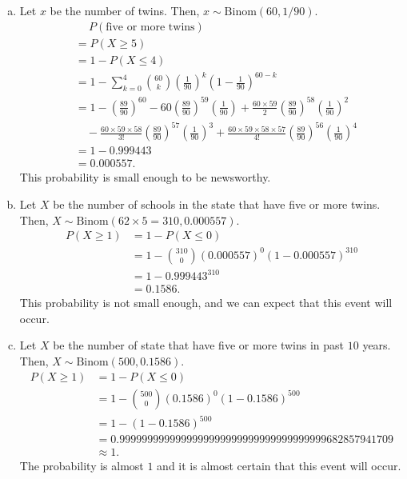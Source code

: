 \documentclass[14pt]{elegantbook}
\begin{document}
    \begin{solution}
        \begin{enumerate}[(a)]
            \item Let $x$ be the number of twins. Then, $x\sim\text{Binom}(60, 1/90)$.
            \begin{align*}
                &\quad\ P(\text{five or more twins})\\
                &=P(X\geq 5)\\
                &=1-P(X\leq 4)\\
                &=1-\sum_{k=0}^4\binom{60}{k}\left(\frac{1}{90}\right)^k\left(1-\frac{1}{90}\right)^{60-k}\\
                &=1-\left(\frac{89}{90}\right)^{60}-60\left(\frac{89}{90}\right)^{59}\left(\frac{1}{90}\right)+\frac{60\times59}{2}\left(\frac{89}{90}\right)^{58}\left(\frac{1}{90}\right)^2\\
                &\quad -\frac{60\times59\times58}{3!}\left(\frac{89}{90}\right)^{57}\left(\frac{1}{90}\right)^3+\frac{60\times59\times58\times57}{4!}\left(\frac{89}{90}\right)^{56}\left(\frac{1}{90}\right)^4\\
                &=1-0.999443\\
                &=0.000557. 
            \end{align*}
            This probability is small enough to be newsworthy. 
            \item Let $X$ be the number of schools in the state that have five or more twins. Then, $X\sim\text{Binom}(62\times 5=310, 0.000557)$. 
            \begin{align*}
                P(X\geq 1)&=1-P(X\leq 0)\\
                &=1-\binom{310}{0}\left(0.000557\right)^0\left(1-0.000557\right)^{310}\\
                &=1-0.999443^{310}\\
                &=0.1586. 
            \end{align*}
            This probability is not small enough, and we can expect that this event will occur. 
            \item Let $X$ be the number of state that have five or more twins in past $10$ years. Then, $X\sim\text{Binom}(500, 0.1586)$. 
            \begin{align*}
                P(X\geq 1)&=1-P(X\leq 0)\\
                &=1-\binom{500}{0}\left(0.1586\right)^0\left(1-0.1586\right)^{500}\\
                &=1-(1-0.1586)^{500}\\
                &=0.9999999999999999999999999999999999999682857941709\\
                &\approx 1.
            \end{align*}
            The probability is almost $1$ and it is almost certain that this event will occur.
        \end{enumerate}
    \end{solution}
\end{document}
